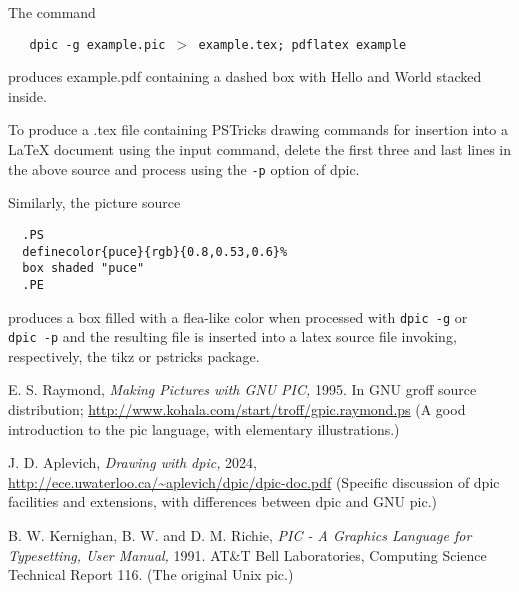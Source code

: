 The command


{\tt \ \ \ dpic\ -g\ example.pic\ $>$\ example.tex;\ pdflatex\ example}

produces example.pdf containing a dashed box with Hello and World
stacked inside.

To produce a .tex file containing PSTricks drawing commands for
insertion into a LaTeX document using the {\tt {}}input command,
delete the first three and last lines in the above source
and process using the
{\tt -p}
option of
dpic.

Similarly, the picture source

{\tt \ \ .PS}
\\\hbox{}\hskip-1pt
{\tt \ \ {\tt {}}definecolor\{puce\}\{rgb\}\{0.8,0.53,0.6\}\%}
\\\hbox{}\hskip-1pt
{\tt \ \ box\ shaded\ {\tt "}puce{\tt "}}
\\\hbox{}\hskip-1pt
{\tt \ \ .PE}

produces a box filled with a flea-like color when processed with
{\tt dpic\ -g}
or
{\tt dpic\ -p}
and the resulting file is inserted into a latex source file invoking,
respectively, the tikz or pstricks package.

E. S. Raymond,
{\it Making Pictures with GNU PIC,}
1995.
In GNU groff source distribution;
\url{http://www.kohala.com/start/troff/gpic.raymond.ps}
(A good introduction to the pic language, with elementary
illustrations.)

J. D. Aplevich,
{\it Drawing with dpic,}
2024,
\url{http://ece.uwaterloo.ca/~aplevich/dpic/dpic-doc.pdf}
(Specific discussion of dpic
facilities and extensions, with differences between dpic and GNU pic.)

B. W. Kernighan, B. W. and D. M. Richie,
{\it PIC - A Graphics Language for Typesetting, User Manual,}
1991.
AT\&T Bell Laboratories,
Computing Science Technical Report
116.
(The original Unix
pic.)

